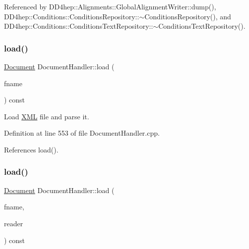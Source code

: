 Referenced by D\+D4hep\+::\+Alignments\+::\+Global\+Alignment\+Writer\+::dump(), D\+D4hep\+::\+Conditions\+::\+Conditions\+Repository\+::$\sim$\+Conditions\+Repository(), and D\+D4hep\+::\+Conditions\+::\+Conditions\+Text\+Repository\+::$\sim$\+Conditions\+Text\+Repository().

\hypertarget{class_d_d4hep_1_1_x_m_l_1_1_document_handler_a092d3cb14789753a796db6356b792830}{}\label{class_d_d4hep_1_1_x_m_l_1_1_document_handler_a092d3cb14789753a796db6356b792830} 
\subsubsection{\texorpdfstring{load()}{load()}\hspace{0.1cm}{\footnotesize\ttfamily [1/4]}}
{\footnotesize\ttfamily \hyperlink{class_d_d4hep_1_1_x_m_l_1_1_document}{Document} Document\+Handler\+::load (\begin{DoxyParamCaption}\item[{const std\+::string \&}]{fname }\end{DoxyParamCaption}) const\hspace{0.3cm}{\ttfamily [virtual]}}



Load \hyperlink{namespace_d_d4hep_1_1_x_m_l}{X\+ML} file and parse it. 



Definition at line 553 of file Document\+Handler.\+cpp.



References load().

\hypertarget{class_d_d4hep_1_1_x_m_l_1_1_document_handler_a6e0d564d1f31a18f66746799f4df4eac}{}\label{class_d_d4hep_1_1_x_m_l_1_1_document_handler_a6e0d564d1f31a18f66746799f4df4eac} 
\subsubsection{\texorpdfstring{load()}{load()}\hspace{0.1cm}{\footnotesize\ttfamily [2/4]}}
{\footnotesize\ttfamily \hyperlink{class_d_d4hep_1_1_x_m_l_1_1_document}{Document} Document\+Handler\+::load (\begin{DoxyParamCaption}\item[{const std\+::string \&}]{fname,  }\item[{\hyperlink{class_d_d4hep_1_1_x_m_l_1_1_uri_reader}{Uri\+Reader} $\ast$}]{reader }\end{DoxyParamCaption}) const\hspace{0.3cm}{\ttfamily [virtual]}}



